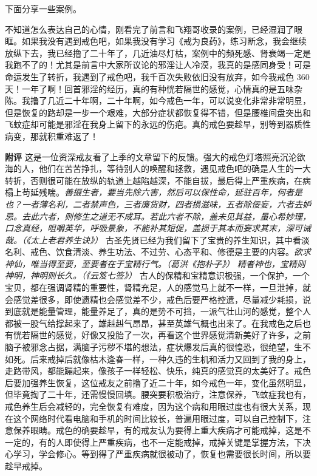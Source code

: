 下面分享一些案例。

\begin{case}
    不知道怎么表达自己的心情，刚看完了前言和飞翔哥收录的案例，已经湿润了眼眶。如果我没有遇到戒色吧，如果我没有学习《戒为良药》，练习断念，我会继续放纵下去，我已经撸了二十年了，几近油尽灯枯，案例中的频死感、肾衰竭一定是我跑不了的！尤其是前言中大家所议论的邪淫让人冷漠，我真的是感同身受！可是命运发生了转折，我遇到了戒色吧，我千百次失败依旧没有放弃，如今我戒色 360 天！一年了啊！回首邪淫的经历，真的有种恍若隔世的感觉，心情真的是五味杂陈。我撸了几近二十年啊，二十年啊，如今戒色一年，可以说变化非常非常明显，但是恢复的路却是一步一个艰难，大部分症状都恢复得不错，但是腰椎间盘突出和飞蚊症却可能是邪淫在我身上留下的永远的伤疤。真的戒色要趁早，别等到器质性病变，那就积重难返了！

    \textbf{附评} 这是一位资深戒友看了上季的文章留下的反馈。强大的戒色灯塔照亮沉沦欲海的人，他们在苦苦挣扎，等待别人的唤醒和拯救，遇见戒色吧的确是人生的一大转折，否则很可能在放纵的轨道上越陷越深，不能自拔，最后得上严重疾病，在病榻上苟延残喘。\textit{善摄生者，要当先除六害，然后可以保性命，延驻百年，何者是也？一者薄名利，二者禁声色，三者廉货财，四者损滋味，五者除佞妄，六者去妒忌。去此六者，则修生之道无不成耳。若此六者不除，盖未见其益，虽心希妙理，口念真经，咀嚼英华，呼吸景象，不能补其短促，盖损于其本而妄求其末，深可诫哉。（《太上老君养生诀》）} 古圣先贤已经为我们留下了宝贵的养生知识，其中看淡名利、戒色、饮食清淡、养生功法、不过劳、心态平和、修德是主要的内容。\textit{欲求神仙，唯当得至要，至要者在于宝精行气。（葛洪《抱朴子》）} \textit{精者神也，宝精则神明，神明则长久。（《云笈七签》）} 古人的保精和宝精意识极强，一个保护，一个宝贝，都在强调肾精的重要性，肾精充足，人的感觉马上就不一样，一旦泄掉，就会感觉差很多，即使遗精也会感觉差不少，戒色后要严格控遗，尽量减少耗损，说到底就是能量管理，能量养足了，真的是势不可挡，一派气壮山河的感觉，整个人都被一股气给撑起来了，雄赳赳气昂昂，甚至英雄气概也出来了。在我戒色之后也有恍若隔世的感觉，好像又投胎了一次，再看这个世界感觉清新美好了许多，之前脑子被邪念占据，满脑子污秽不堪的想法，症状爆发后真的很惶恐，很绝望，生不如死。后来戒掉后就像枯木逢春一样，一种久违的生机和活力又回到了我的身上，走路带风，都能蹦起来，像孩子一样轻松、快乐，纯真的感觉真的太美好了。戒色后要加强养生恢复，这位戒友之前撸了近二十年，如今戒色一年，变化虽然明显，但毕竟掏了二十年，还需慢慢回填。腰突要积极治疗，注意保养，飞蚊症我也有，戒色养生后会减轻的，完全恢复有难度，因为这个病和用眼过度也有很大关系，现在这个网络时代看电脑和手机的时间比较长，普遍用眼过度，可以自己控制下，注意保养眼睛。戒色的确要趁早，有的戒友认为要得上重大疾病才可能戒掉，这是不一定的，有的人即使得上严重疾病，也不一定能戒掉，戒掉关键是掌握方法，下决心学习，学会修心。等到得了严重疾病就很被动了，恢复也需要很长时间，所以要趁早戒掉。
\end{case}

